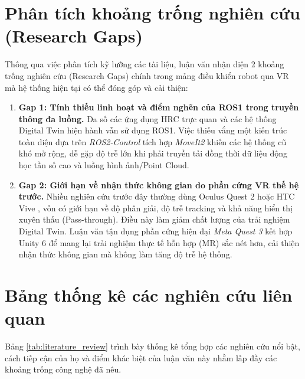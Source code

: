 \section{Phân tích khoảng trống nghiên cứu (Research Gaps)}
Thông qua việc phân tích kỹ lưỡng các tài liệu, luận văn nhận diện 2 khoảng trống nghiên cứu (Research Gaps) chính trong mảng điều khiển robot qua VR mà hệ thống hiện tại có thể đóng góp và cải thiện:
\begin{enumerate}
    \item \textbf{Gap 1: Tính thiếu linh hoạt và điểm nghẽn của ROS1 trong truyền thông đa luồng.} Đa số các ứng dụng HRC trực quan \cite{hetrick2020comparing, chen2023comparing} và các hệ thống Digital Twin hiện hành \cite{kawshan2026digital} vẫn sử dụng ROS1. Việc thiếu vắng một kiến trúc toàn diện dựa trên \textit{ROS2-Control} tích hợp \textit{MoveIt2} khiến các hệ thống cũ khó mở rộng, dễ gặp độ trễ lớn khi phải truyền tải đồng thời dữ liệu động học tần số cao và luồng hình ảnh/Point Cloud.
    \item \textbf{Gap 2: Giới hạn về nhận thức không gian do phần cứng VR thế hệ trước.} Nhiều nghiên cứu trước đây thường dùng Oculus Quest 2 hoặc HTC Vive \cite{naceri2021vicarios, chen2023comparing}, vốn có giới hạn về độ phân giải, độ trễ tracking và khả năng hiển thị xuyên thấu (Pass-through). Điều này làm giảm chất lượng của trải nghiệm Digital Twin. Luận văn tận dụng phần cứng hiện đại \textit{Meta Quest 3} kết hợp Unity 6 để mang lại trải nghiệm thực tế hỗn hợp (MR) sắc nét hơn, cải thiện nhận thức không gian mà không làm tăng độ trễ hệ thống.
\end{enumerate}

\section{Bảng thống kê các nghiên cứu liên quan}
Bảng \ref{tab:literature_review} trình bày thống kê tổng hợp các nghiên cứu nổi bật, cách tiếp cận của họ và điểm khác biệt của luận văn này nhằm lấp đầy các khoảng trống công nghệ đã nêu.

